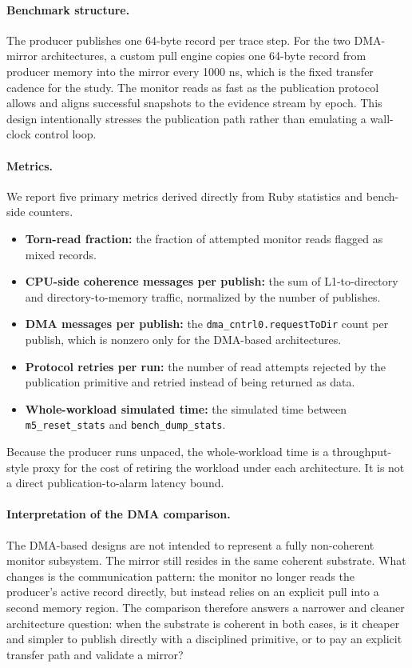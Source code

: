 \paragraph{Benchmark structure.}
The producer publishes one 64-byte record per trace step. For the two
DMA-mirror architectures, a custom pull engine copies one 64-byte record
from producer memory into the mirror every 1000 ns, which is the fixed
transfer cadence for the study. The monitor reads as fast as the
publication protocol allows and aligns successful snapshots to the
evidence stream by epoch. This design intentionally stresses the
publication path rather than emulating a wall-clock control loop.

\paragraph{Metrics.}
We report five primary metrics derived directly from Ruby statistics and
bench-side counters.
\begin{itemize}
  \item \textbf{Torn-read fraction:} the fraction of attempted monitor
    reads flagged as mixed records.
  \item \textbf{CPU-side coherence messages per publish:} the sum of
    L1-to-directory and directory-to-memory traffic, normalized by the
    number of publishes.
  \item \textbf{DMA messages per publish:} the
    \texttt{dma\_cntrl0.requestToDir} count per publish, which is nonzero
    only for the DMA-based architectures.
  \item \textbf{Protocol retries per run:} the number of read attempts
    rejected by the publication primitive and retried instead of being
    returned as data.
  \item \textbf{Whole-workload simulated time:} the simulated time
    between \texttt{m5\_reset\_stats} and \texttt{bench\_dump\_stats}.
\end{itemize}
Because the producer runs unpaced, the whole-workload time is a
throughput-style proxy for the cost of retiring the workload under each
architecture. It is not a direct publication-to-alarm latency bound.

\paragraph{Interpretation of the DMA comparison.}
The DMA-based designs are not intended to represent a fully
non-coherent monitor subsystem. The mirror still resides in the same
coherent substrate. What changes is the communication pattern: the
monitor no longer reads the producer's active record directly, but
instead relies on an explicit pull into a second memory region. The
comparison therefore answers a narrower and cleaner architecture
question: when the substrate is coherent in both cases, is it cheaper
and simpler to publish directly with a disciplined primitive, or to pay
an explicit transfer path and validate a mirror?

